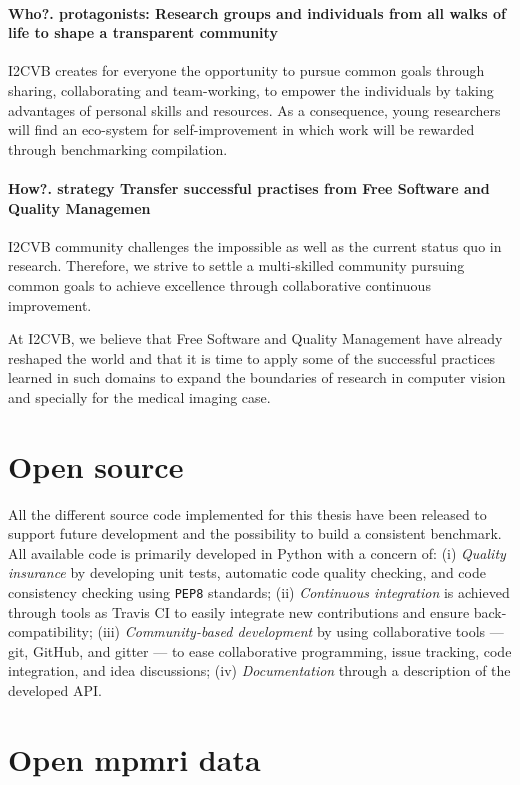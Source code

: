 \paragraph{Who?. protagonists: Research groups and individuals from all walks of life to shape a transparent community}
I2CVB creates for everyone the opportunity to pursue common goals through sharing, collaborating and team-working, to empower the individuals by taking advantages of personal skills and resources. As a consequence, young researchers will find an eco-system for self-improvement in which work will be rewarded through benchmarking compilation.

\paragraph{How?. strategy Transfer successful practises from Free Software and Quality Managemen}
I2CVB community challenges the impossible as well as the current status quo in research. Therefore, we strive to settle a multi-skilled community pursuing common goals to achieve excellence through collaborative continuous improvement.

At I2CVB, we believe that Free Software and Quality Management have already reshaped the world and that it is time to apply some of the successful practices learned in such domains to expand the boundaries of research in computer vision and specially for the medical imaging case.


\section{Open source}

All the different source code implemented for this thesis have been released to support future development and the possibility to build a consistent benchmark.
All available code is primarily developed in Python with a concern of:
(i) \emph{Quality insurance} by developing unit tests, automatic code quality checking, and code consistency checking using \texttt{PEP8} standards;
(ii) \emph{Continuous integration} is achieved through tools as Travis CI to easily integrate new contributions and ensure back-compatibility;
(iii) \emph{Community-based development} by using collaborative tools --- git, GitHub, and gitter --- to ease collaborative programming, issue tracking, code integration, and idea discussions;
(iv) \emph{Documentation} through a description of the developed API.

\section{Open \acs*{mpmri} data}


